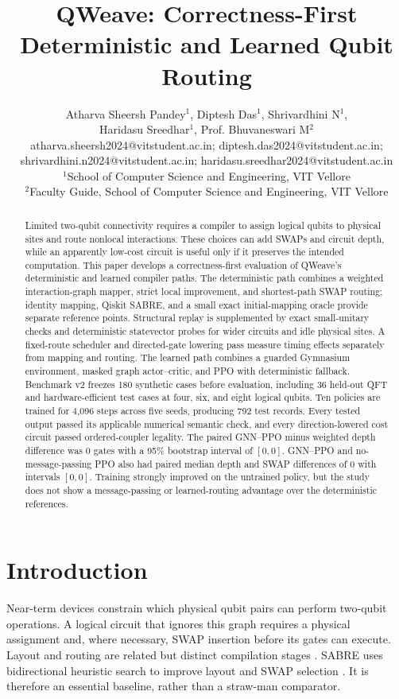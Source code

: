 \documentclass[a4paper,10pt,twocolumn]{article}
\title{QWeave: Correctness-First Deterministic and Learned Qubit Routing}
\author{%
Atharva Sheersh Pandey$^{1}$, Diptesh Das$^{1}$, Shrivardhini N$^{1}$,\\
Haridasu Sreedhar$^{1}$, Prof. Bhuvaneswari M$^{2}$\\[2pt]
\small atharva.sheersh2024@vitstudent.ac.in; diptesh.das2024@vitstudent.ac.in;\\
\small shrivardhini.n2024@vitstudent.ac.in; haridasu.sreedhar2024@vitstudent.ac.in\\[2pt]
\small $^{1}$School of Computer Science and Engineering, VIT Vellore\\
\small $^{2}$Faculty Guide, School of Computer Science and Engineering, VIT Vellore
}
\date{}
\begin{document}
\maketitle
\begin{abstract}
Limited two-qubit connectivity requires a compiler to assign logical qubits
to physical sites and route nonlocal interactions. These choices can add
SWAPs and circuit depth, while an apparently low-cost circuit is useful only
if it preserves the intended computation. This paper develops a
correctness-first evaluation of QWeave's deterministic and learned compiler
paths. The deterministic path combines a weighted interaction-graph mapper,
strict local improvement, and shortest-path SWAP routing; identity mapping,
Qiskit SABRE, and a small exact initial-mapping oracle provide separate
reference points. Structural replay is supplemented by exact small-unitary
checks and deterministic statevector probes for wider circuits and idle
physical sites. A fixed-route scheduler and directed-gate lowering pass
measure timing effects separately from mapping and routing. The learned path
combines a guarded Gymnasium environment, masked graph actor--critic, and PPO
with deterministic fallback. Benchmark v2 freezes 180 synthetic cases before
evaluation, including 36 held-out QFT and hardware-efficient test cases at
four, six, and eight logical qubits. Ten policies are trained for 4,096 steps
across five seeds, producing 792 test records. Every tested output passed its
applicable numerical semantic check, and every direction-lowered cost circuit
passed ordered-coupler legality. The paired GNN--PPO minus weighted depth
difference was 0 gates with a 95\% bootstrap interval of $[0,0]$.
GNN--PPO and no-message-passing PPO also had paired median depth and SWAP
differences of 0 with intervals $[0,0]$. Training strongly improved on the
untrained policy, but the study does not show a message-passing or
learned-routing advantage over the deterministic references.
\end{abstract}

\section{Introduction}
Near-term devices constrain which physical qubit pairs can perform
two-qubit operations. A logical circuit that ignores this graph requires a
physical assignment and, where necessary, SWAP insertion before its gates
can execute. Layout and routing are related but distinct compilation stages
\cite{ibmtranspiler}. SABRE uses bidirectional heuristic search to improve
layout and SWAP selection \cite{li2019sabre}. It is therefore an essential
baseline, rather than a straw-man comparator.
\end{document}
